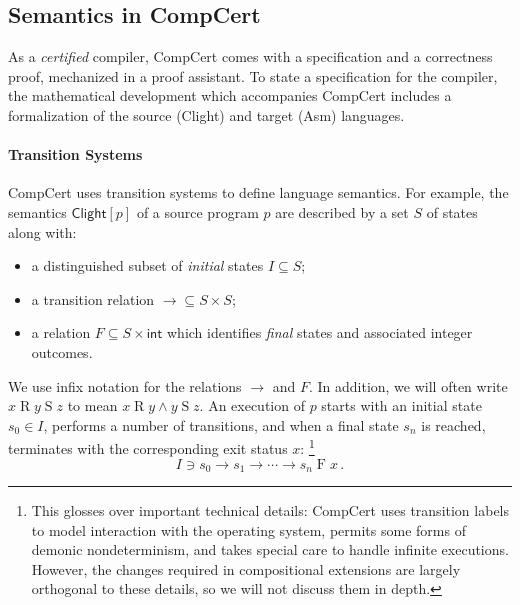 \documentclass[acmsmall,screen,review,anonymous]{acmart}
\newcommand{\kw}[1]{\ensuremath{ \mathsf{#1} }}
\begin{document}

\subsection{Semantics in CompCert} %

As a \emph{certified} compiler,
CompCert comes with a specification
and a correctness proof,
mechanized in a proof assistant.
To state a specification for the compiler,
the mathematical development which accompanies
CompCert
includes a formalization of the source (Clight) and target (Asm) languages.

\paragraph{Transition Systems}

CompCert uses transition systems
to define language semantics.
For example,
the semantics $\kw{Clight}[p]$
of a source program $p$
are described by a set $S$ of states along with:%
\begin{itemize}
  \item a distinguished subset of \emph{initial} states $I \subseteq S$;
  \item a transition relation ${\rightarrow} \subseteq S \times S$;
  \item a relation $F \subseteq S \times \kw{int}$ which identifies
    \emph{final} states and associated integer outcomes.
\end{itemize}
We use infix notation for the relations $\rightarrow$ and $F$.
In addition, we will often write $x \mathrel{R} y \mathrel{S} z$
to mean $x \mathrel{R} y \mathrel\wedge y \mathrel{S} z$.
An execution of $p$ starts with an initial state $s_0 \in I$,
performs a number of transitions,
and when a final state $s_n$ is reached,
terminates with the corresponding exit status $x$:%
\footnote{%
  This glosses over important technical details:
  CompCert uses transition labels to model interaction with the operating system,
  permits some forms of demonic nondeterminism,
  and takes special care to handle infinite executions.
  However, the changes required in compositional extensions
  are largely orthogonal to these details,
  so we will not discuss them in depth.}
\begin{equation}
  I \ni s_0 \rightarrow s_1 \rightarrow \cdots \rightarrow s_n \mathrel{F} x
  \,.
  \label{eqn:clightexec}
\end{equation}
\end{document}
